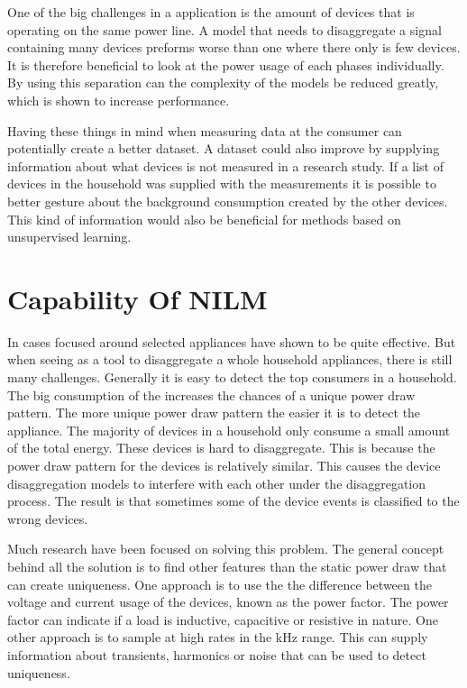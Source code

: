 One of the big challenges in a  application is the amount of devices that is operating on the same power line. A model that needs to disaggregate a signal containing many devices preforms worse than one where there only is few devices. It is therefore beneficial to look at the power usage of each phases individually. By using this separation can the complexity of the models be reduced greatly, which is shown to increase performance. 

Having these things in mind when measuring data at the consumer can potentially create a better dataset. A dataset could also improve by supplying information about what devices is not measured in a research study. If a list of devices in the household was supplied with the measurements it is possible to better gesture about the background consumption created by the other devices. This kind of information would also be beneficial for methods based on unsupervised learning. 

\section{Capability Of NILM}
In cases focused around selected appliances have  shown to be quite effective. But when seeing  as a tool to disaggregate a whole household appliances, there is still many challenges. Generally it is easy to detect the top consumers in a household. The big consumption of the increases the chances of a unique power draw pattern. The more unique power draw pattern the easier it is to detect the appliance. The majority of devices in a household only consume a small amount of the total energy. These devices is hard to disaggregate. This is because the power draw pattern for the devices is relatively similar. This causes the device disaggregation models to interfere with each other under the disaggregation process. The result is that sometimes some of the device events is classified to the wrong devices. 

Much research have been focused on solving this problem. The general concept behind all the solution is to find other features than the static power draw that can create uniqueness. One approach is to use the the difference between the voltage and current usage of the devices, known as the power factor. The power factor can indicate if a load is inductive, capacitive or resistive in nature. One other approach is to sample at high rates in the kHz range. This can supply information about transients, harmonics or noise that can be used to detect uniqueness.

